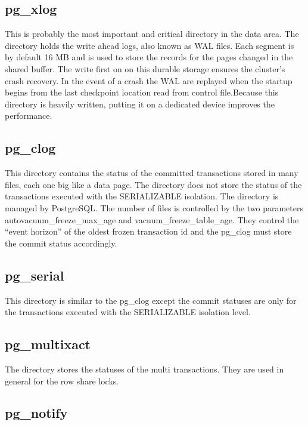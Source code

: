 \subsection{pg\_xlog}

This is probably the most important and critical directory in the data area.
The directory holds the write ahead logs,  also known as WAL
files. Each segment is by default 16 MB and is used to store the records for
the pages changed in the shared buffer. The write first on on this durable
storage ensures the cluster's crash recovery. In the event of a crash the WAL
are replayed when the startup begins from the last checkpoint location read
from control file.Because this directory is heavily written, putting it on a
dedicated device improves the performance.

\subsection{pg\_clog}

This directory contains the status of the committed transactions stored in many
files, each one big like a data page. The directory does not store the status
of the transactions executed with the SERIALIZABLE isolation. The directory is
managed by PostgreSQL. The number of files is controlled by the two parameters
autovacuum\_freeze\_max\_age and vacuum\_freeze\_table\_age. They control the
``event horizon'' of the oldest frozen transaction id and the pg\_clog must
store the commit status accordingly.

\subsection{pg\_serial}

This directory is similar to the pg\_clog except the commit statuses are only
for the transactions executed with the SERIALIZABLE isolation level.

\subsection{pg\_multixact}

The directory stores the statuses of the multi transactions. They are used in
general for the row share locks.

\subsection{pg\_notify}


